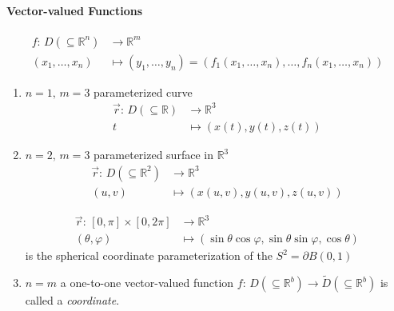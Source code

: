 \paragraph{Vector-valued Functions}
\begin{align*}
    f:\,D\left(\subseteq\mathbb{R}^n\right) & \to\mathbb{R}^m                                                                                                  \\
    \left(x_1,\dots,x_n\right)              & \mapsto\left(y_1,\dots,y_n\right)=\left(f_1\left(x_1,\dots,x_n\right),\dots,f_n\left(x_1,\dots,x_n\right)\right)
\end{align*}

\begin{example}
    \begin{enumerate}
        \item $n=1,\,m=3$ parameterized curve
              \begin{align*}
                  \overrightarrow{r}:\,D\left(\subseteq\mathbb{R}\right) & \to\mathbb{R}^3                    \\
                  t                                                      & \mapsto\left(x(t),y(t),z(t)\right)
              \end{align*}
        \item $n=2,\,m=3$ parameterized surface in $\mathbb{R}^3$
              \begin{align*}
                  \overrightarrow{r}:\,D\left(\subseteq\mathbb{R}^2\right) & \to\mathbb{R}^3                          \\
                  \left(u,v\right)                                         & \mapsto\left(x(u,v),y(u,v),z(u,v)\right)
              \end{align*}
              \begin{example}
                  \begin{align*}
                      \overrightarrow{r}:\,[0,\pi]\times[0,2\pi] & \to\mathbb{R}^3                                                            \\
                      (\theta,\varphi)                           & \mapsto\left(\sin\theta\cos\varphi,\sin\theta\sin\varphi,\cos\theta\right)
                  \end{align*}is the spherical coordinate parameterization of the $S^2=\partial B(0,1)$
              \end{example}
        \item $n=m$ a one-to-one vector-valued function $f:\,D\left(\subseteq\mathbb{R}^b\right)\to\tilde{D}\left(\subseteq\mathbb{R}^b\right)$ is called a \emph{coordinate}.
    \end{enumerate}
\end{example}

